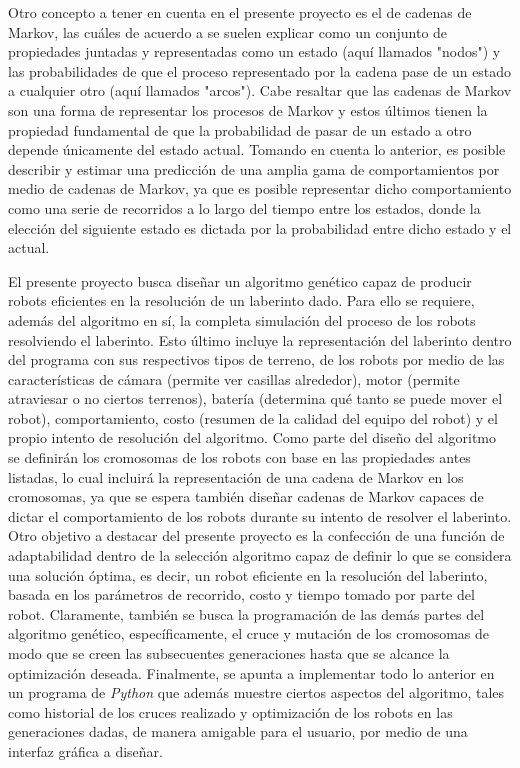 \documentclass[conference]{IEEEtran}
\begin{document}
Otro concepto a tener en cuenta en el presente proyecto es el de cadenas de Markov, las cuáles de acuerdo a \cite{b2} se suelen explicar como un conjunto de propiedades juntadas y representadas como un estado (aquí llamados "nodos") y las probabilidades de que el proceso representado por la cadena pase de un estado a cualquier otro (aquí llamados "arcos"). Cabe resaltar que las cadenas de Markov son una forma de representar los procesos de Markov y estos últimos tienen la propiedad fundamental de que la probabilidad de pasar de un estado a otro depende únicamente del estado actual. Tomando en cuenta lo anterior, es posible describir y estimar una predicción de una amplia gama de comportamientos por medio de cadenas de Markov, ya que es posible representar dicho comportamiento como una serie de recorridos a lo largo del tiempo entre los estados, donde la elección del siguiente estado es dictada por la probabilidad entre dicho estado y el actual.

El presente proyecto busca diseñar un algoritmo genético capaz de producir robots eficientes en la resolución de un laberinto dado. Para ello se requiere, además del algoritmo en sí, la completa simulación del proceso de los robots resolviendo el laberinto. Esto último incluye la representación del laberinto dentro del programa con sus respectivos tipos de terreno, de los robots por medio de las características de cámara (permite ver casillas alrededor), motor (permite atraviesar o no ciertos terrenos), batería (determina qué tanto se puede mover el robot), comportamiento, costo (resumen de la calidad del equipo del robot) y el propio intento de resolución del algoritmo. Como parte del diseño del algoritmo se definirán los cromosomas de los robots con base en las propiedades antes listadas, lo cual incluirá la representación de una cadena de Markov en los cromosomas, ya que se espera también diseñar cadenas de Markov capaces de dictar el comportamiento de los robots durante su intento de resolver el laberinto. Otro objetivo a destacar del presente proyecto es la confección de una función de adaptabilidad dentro de la selección algoritmo capaz de definir lo que se considera una solución óptima, es decir, un robot eficiente en la resolución del laberinto, basada en los parámetros de recorrido, costo y tiempo tomado por parte del robot. Claramente, también se busca la programación de las demás partes del algoritmo genético, específicamente, el cruce y mutación de los cromosomas de modo que se creen las subsecuentes generaciones hasta que se alcance la optimización deseada. Finalmente, se apunta a implementar todo lo anterior en un programa de \textit{Python} que además muestre ciertos aspectos del algoritmo, tales como historial de los cruces realizado y optimización de los robots en las generaciones dadas, de manera amigable para el usuario, por medio de una interfaz gráfica a diseñar.
\end{document}
